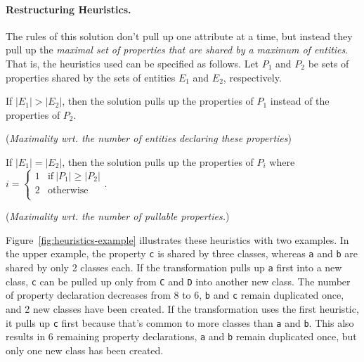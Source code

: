 \documentclass[submission]{eptcs}
\begin{document}
\paragraph{Restructuring Heuristics.}

The rules of this solution don't pull up one attribute at a time, but instead
they pull up the \emph{maximal set of properties that are shared by a maximum
  of entities}.  That is, the heuristics used can be specified as follows.  Let
$P_1$ and $P_2$ be sets of properties shared by the sets of entities $E_1$ and
$E_2$, respectively.

\begin{compactenum}
\item If $|E_1| > |E_2|$, then the solution pulls up the properties of $P_1$
  instead of the properties of $P_2$.

  (\emph{Maximality wrt. the number of entities declaring these properties})
\item If $|E_1| = |E_2|$, then the solution pulls up the properties of $P_i$
  where~$i = \left\{\begin{array}{ll}1 & \text{if}~|P_1| \geq |P_2|\\2 &
      \text{otherwise}\\ \end{array}\right.$.

  (\emph{Maximality wrt. the number of pullable properties.})
\end{compactenum}

Figure~\ref{fig:heuristics-example} illustrates these heuristics with two
examples.  In the upper example, the property \verb|c| is shared by three
classes, whereas \verb|a| and \verb|b| are shared by only 2 classes each.  If
the transformation pulls up \verb|a| first into a new class, \verb|c| can be
pulled up only from \verb|C| and \verb|D| into another new class.  The number
of property declaration decreases from 8 to 6, \verb|b| and \verb|c| remain
duplicated once, and 2 new classes have been created.  If the transformation
uses the first heuristic, it pulls up \verb|c| first because that's common to
more classes than \verb|a| and \verb|b|.  This also results in 6 remaining
property declarations, \verb|a| and \verb|b| remain duplicated once, but only
one new class has been created.
\end{document}
